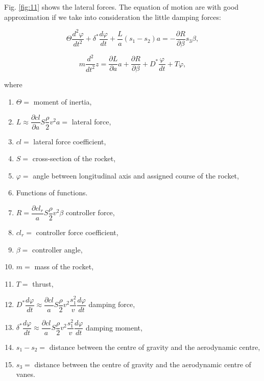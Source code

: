 \documentclass[12pt, a4paper]{article}
\begin{document}
Fig. \ref{fig:11} shows the lateral forces. The equation of motion are with good approximation if we take into consideration the little damping forces:

\begin{equation}
  \Theta\frac{d^{2}\varphi}{dt^{2}}+\delta^{*}\frac{d\varphi}{dt}+\frac{L}{a}(s_{1}-s_{2})a=-\frac{\partial R}{\partial\beta}s_{3}\beta,
\end{equation}

\begin{equation}
  m\frac{d^{2}}{dt^{2}}z=\frac{\partial L}{\partial a}a+\frac{\partial R}{\partial\beta}+D^{*}\frac{\varphi}{dt}+T\varphi,
\end{equation}

where

\begin{enumerate}[label={}]
  \item $\Theta=$ moment of inertia,
  \item $L\approx\dfrac{\partial cl}{\partial a}S\dfrac{\rho}{2}v^{2}a=$ lateral force,
  \item $cl=$ lateral force coefficient,
  \item $S=$ cross-section of the rocket,
  \item $\varphi=$ angle between longitudinal axis and assigned course of the rocket,
  \item Functions of functions.

  \item $R=\dfrac{\partial cl_{r}}{a}S\dfrac{\rho}{2}v^{2}\beta$ controller force,
  \item $cl_{r}=$ controller force coefficient,
  \item $\beta=$ controller angle,
  \item $m=$ mass of the rocket,
  \item $T=$ thrust,
  \item $D^{*}\dfrac{d\varphi}{dt}\approx\dfrac{\partial cl}{a}S\dfrac{\rho}{2}v^{2}\dfrac{s^{2}_{1}}{v}\dfrac{d\varphi}{dt}$ damping force,
  \item $\delta^{*}\dfrac{d\varphi}{dt}\approx\dfrac{\partial cl}{a}S\dfrac{\rho}{2}v^{2}\dfrac{s^{2}_{1}}{v}\dfrac{d\varphi}{dt}$ damping moment,
  \item $s_{1}-s_{2}=$ distance between the centre of gravity and the aerodynamic centre,
  \item $s_{3}=$ distance between the centre of gravity and the aerodynamic centre of vanes.
\end{enumerate}
\end{document}
